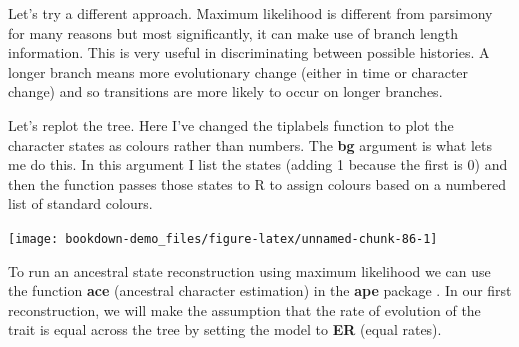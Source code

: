 \documentclass[
]{book}
\newenvironment{Shaded}{\begin{snugshade}}{\end{snugshade}}
\newcommand{\CommentTok}[1]{\textcolor[rgb]{0.56,0.35,0.01}{\textit{#1}}}
\newcommand{\DataTypeTok}[1]{\textcolor[rgb]{0.13,0.29,0.53}{#1}}
\newcommand{\DecValTok}[1]{\textcolor[rgb]{0.00,0.00,0.81}{#1}}
\newcommand{\FloatTok}[1]{\textcolor[rgb]{0.00,0.00,0.81}{#1}}
\newcommand{\KeywordTok}[1]{\textcolor[rgb]{0.13,0.29,0.53}{\textbf{#1}}}
\newcommand{\NormalTok}[1]{#1}
\newcommand{\OperatorTok}[1]{\textcolor[rgb]{0.81,0.36,0.00}{\textbf{#1}}}
\newcommand{\OtherTok}[1]{\textcolor[rgb]{0.56,0.35,0.01}{#1}}
\newcommand{\StringTok}[1]{\textcolor[rgb]{0.31,0.60,0.02}{#1}}
\begin{document}
Let's try a different approach. Maximum likelihood is different from parsimony for many reasons but most significantly, it can make use of branch length information. This is very useful in discriminating between possible histories. A longer branch means more evolutionary change (either in time or character change) and so transitions are more likely to occur on longer branches.

Let's replot the tree. Here I've changed the tiplabels function to plot the character states as colours rather than numbers. The \textbf{bg} argument is what lets me do this. In this argument I list the states (adding 1 because the first is 0) and then the function passes those states to R to assign colours based on a numbered list of standard colours.

\begin{Shaded}
\end{Shaded}

\begin{center}\texttt{[image: bookdown-demo\_files/figure-latex/unnamed-chunk-86-1]} \end{center}

To run an ancestral state reconstruction using maximum likelihood we can use the function \textbf{ace} (ancestral character estimation) in the \textbf{ape} package \citep{ape}. In our first reconstruction, we will make the assumption that the rate of evolution of the trait is equal across the tree by setting the model to \textbf{ER} (equal rates).

\begin{Shaded}
\end{Shaded}
\end{document}

